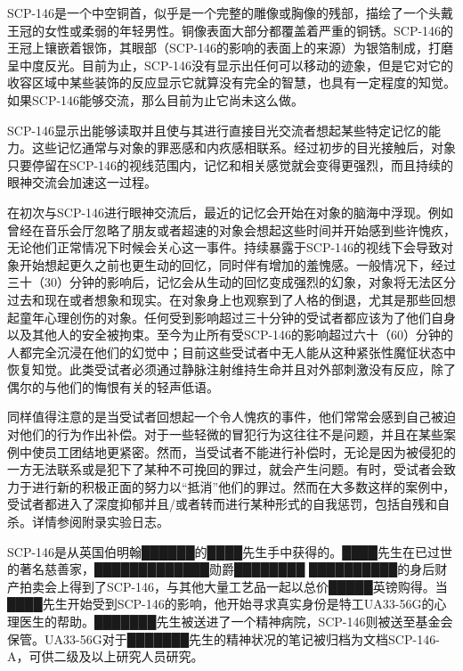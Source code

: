 SCP-146是一个中空铜首，似乎是一个完整的雕像或胸像的残部，描绘了一个头戴王冠的女性或柔弱的年轻男性。铜像表面大部分都覆盖着严重的铜锈。SCP-146的王冠上镶嵌着银饰，其眼部（SCP-146的影响的表面上的来源）为银箔制成，打磨呈中度反光。目前为止，SCP-146没有显示出任何可以移动的迹象，但是它对它的收容区域中某些装饰的反应显示它就算没有完全的智慧，也具有一定程度的知觉。如果SCP-146能够交流，那么目前为止它尚未这么做。

SCP-146显示出能够读取并且使与其进行直接目光交流者想起某些特定记忆的能力。这些记忆通常与对象的罪恶感和内疚感相联系。经过初步的目光接触后，对象只要停留在SCP-146的视线范围内，记忆和相关感觉就会变得更强烈，而且持续的眼神交流会加速这一过程。

在初次与SCP-146进行眼神交流后，最近的记忆会开始在对象的脑海中浮现。例如曾经在音乐会厅忽略了朋友或者超速的对象会想起这些时间并开始感到些许愧疚，无论他们正常情况下时候会关心这一事件。持续暴露于SCP-146的视线下会导致对象开始想起更久之前也更生动的回忆，同时伴有增加的羞愧感。一般情况下，经过三十（30）分钟的影响后，记忆会从生动的回忆变成强烈的幻象，对象将无法区分过去和现在或者想象和现实。在对象身上也观察到了人格的倒退，尤其是那些回想起童年心理创伤的对象。任何受到影响超过三十分钟的受试者都应该为了他们自身以及其他人的安全被拘束。至今为止所有受SCP-146的影响超过六十（60）分钟的人都完全沉浸在他们的幻觉中；目前这些受试者中无人能从这种紧张性魔怔状态中恢复知觉。此类受试者必须通过静脉注射维持生命并且对外部刺激没有反应，除了偶尔的与他们的悔恨有关的轻声低语。

同样值得注意的是当受试者回想起一个令人愧疚的事件，他们常常会感到自己被迫对他们的行为作出补偿。对于一些轻微的冒犯行为这往往不是问题，并且在某些案例中使员工团结地更紧密。然而，当受试者不能进行补偿时，无论是因为被侵犯的一方无法联系或是犯下了某种不可挽回的罪过，就会产生问题。有时，受试者会致力于进行新的积极正面的努力以“抵消”他们的罪过。然而在大多数这样的案例中，受试者都进入了深度抑郁并且\slash 或者转而进行某种形式的自我惩罚，包括自残和自杀。详情参阅附录实验日志。

SCP-146是从英国伯明翰██████的████先生手中获得的。████先生在已过世的著名慈善家，█████████████勋爵████████ ██████████的身后财产拍卖会上得到了SCP-146，与其他大量工艺品一起以总价█████英镑购得。当████先生开始受到SCP-146的影响，他开始寻求真实身份是特工UA33-56G的心理医生的帮助。███████先生被送进了一个精神病院，SCP-146则被送至基金会保管。UA33-56G对于███████先生的精神状况的笔记被归档为文档SCP-146-A，可供二级及以上研究人员研究。

\hr


